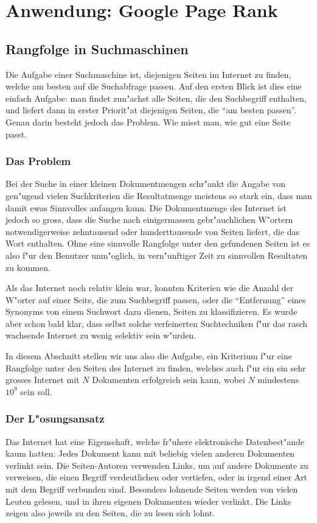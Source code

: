%
%
%
\section{Anwendung: Google Page Rank} \label{pagerank}

\subsection{Rangfolge in Suchmaschinen}
Die Aufgabe einer Suchmaschine ist, diejenigen Seiten im Internet zu
finden, welche am besten auf die Suchabfrage passen. Auf den ersten
Blick ist dies eine einfach Aufgabe: man findet zun"achst alle Seiten,
die den Suchbegriff enthalten, und liefert dann in erster Priorit"at
diejenigen Seiten, die ``am besten passen''. Genau darin besteht jedoch
das Problem. Wie misst man, wie gut eine Seite passt.

\subsubsection{Das Problem}
Bei der Suche in einer kleinen Dokumentmengen schr"ankt die Angabe von
gen"ugend vielen Suchkriterien die Resultatmenge meistens so stark
ein, dass man damit ewas Sinnvolles anfangen kann. Die Dokumentmenge
des Internet ist jedoch so gross, dass die Suche nach einigermassen
gebr"auchlichen W"ortern notwendigerweise zehntausend oder hunderttausende
von Seiten liefert, die das Wort enthalten. Ohne eine sinnvolle Rangfolge
unter den gefundenen Seiten ist es also f"ur den Benutzer unm"oglich, in
vern"unftiger Zeit zu sinnvollen Resultaten zu kommen.

Als das Internet noch relativ klein war, konnten Kriterien wie die
Anzahl der W"orter auf einer Seite, die zum Suchbegriff passen,
oder die ``Entfernung'' eines Synonyms von einem Suchwort dazu dienen,
Seiten zu klassifizieren. Es wurde aber schon bald klar, dass selbst
solche verfeinerten Suchtechniken f"ur das rasch wachsende Internet
zu wenig selektiv sein w"urden.

In diesem Abschnitt stellen wir uns also die Aufgabe, ein Kriterium
f"ur eine Rangfolge unter den Seiten des Internet zu finden, welches auch
f"ur ein ein sehr grosses Internet mit $N$ Dokumenten erfolgreich sein kann,
wobei $N$ mindestens $10^9$ sein soll.

\subsubsection{Der L"osungsansatz}
Das Internet hat eine Eigenschaft, welche fr"uhere elektronische 
Datenbest"ande kaum hatten: Jedes Dokument kann mit beliebig vielen anderen
Dokumenten verlinkt sein. Die Seiten-Autoren verwenden Links, um auf
andere Dokumente zu verweisen, die einen Begriff verdeutlichen oder
vertiefen, oder in irgend einer Art mit dem Begriff verbunden sind.
Besonders lohnende Seiten werden von vielen Leuten gelesen, und in ihren
eigenen Dokumenten wieder verlinkt. Die Links zeigen also jeweils zu den
Seiten, die zu lesen sich lohnt.


